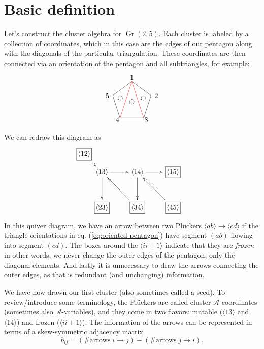 \documentclass[11pt]{article}
\DeclareMathOperator{\Gr}{Gr}
\def\ket#1{\langle #1 \rangle}
\def\a{\mathcal{A}}
\def\drawLabeledPentagon{
\coordinate (P1) at (90:1);
\coordinate (P2) at (18:1);
\coordinate (P3) at (306:1);
\coordinate (P4) at (234:1);
\coordinate (P5) at (162:1);
\draw (P1) -- (P2) -- (P3) -- (P4) -- (P5) -- cycle;
\draw (0,1.2) node {1};
\draw (1,.3) node[anchor=west] {2};
\draw (.5,-.9) node[anchor=west] {3};
\draw (-.5,-.9) node[anchor=east] {4};
\draw (-1,.3) node[anchor=east] {5};
}
\begin{document}
\section{Basic definition}

Let's construct the cluster algebra for $\Gr(2,5)$. Each cluster is labeled by a collection of coordinates, which in this case are the edges of our pentagon along with the diagonals of the particular triangulation. These coordinates are then connected via an orientation of the pentagon and all subtriangles, for example:
\begin{equation}\label{eq:oriented-pentagon}
\begin{tikzpicture}
  \drawLabeledPentagon
  \draw[color=red] (P1) -- (P3);
  \draw[color=red] (P1) -- (P4);
  \draw (18:.6) node[rotate=144] {$\circlearrowleft$};
  \draw (0:0) node[rotate=144] {$\circlearrowleft$};
  \draw (162:.6) node[rotate=144] {$\circlearrowleft$};
\end{tikzpicture} 
\end{equation}
We can redraw this diagram as
\begin{equation}\label{eq:gr25-seed}
\begin{gathered}
\begin{xy} 0;<1pt,0pt>:<0pt,-1pt>::
	(25,25) *+{\langle 13\rangle} ="0",
	(75,25) *+{\langle 14\rangle} ="1",
	(125,25) *+{\framebox[5ex]{$\langle 15\rangle$}} ="2",
	(125,75) *+{\framebox[5ex]{$\langle 45\rangle$}} ="3",
	(75,75) *+{\framebox[5ex]{$\langle 34\rangle$}} ="4",
	(25,75) *+{\framebox[5ex]{$\langle 23\rangle$}} ="5",
	(0,0) *+{\framebox[5ex]{$\langle 12\rangle$}} ="6",
	(145,75) *+{},
	"0", {\ar"1"},
	"4", {\ar"0"},
	"0", {\ar"5"},
	"6", {\ar"0"},
	"1", {\ar"2"},
	"3", {\ar"1"},
	"1", {\ar"4"},
\end{xy}
\end{gathered}
\end{equation}
In this quiver diagram, we have an arrow between two Pl\"uckers $\ket{ab} \to \ket{cd}$ if the triangle orientations in eq. (\ref{eq:oriented-pentagon}) have segment $(ab)$ flowing into segment $(cd)$. The boxes around the $\ket{ii+1}$ indicate that they are \emph{frozen} -- in other words, we never change the outer edges of the pentagon, only the diagonal elements. And lastly it is unnecessary to draw the arrows connecting the outer edges, as that is redundant (and unchanging) information. 

We have now drawn our first cluster (also sometimes called a seed). To review/introduce some terminology, the Pl\"uckers are called cluster $\a$-coordinates (sometimes also $\a$-variables), and they come in two flavors: mutable ($\ket{13}$ and $\ket{14}$) and frozen ($\ket{ii+1}$). The information of the arrows can be represented in terms of a skew-symmetric adjacency matrix
\begin{equation}
	b_{i j} = (\# \text{arrows}\; i \to j) - (\# \text{arrows}\; j \to i).
\label{eq:bijdef}
\end{equation}
\end{document}
